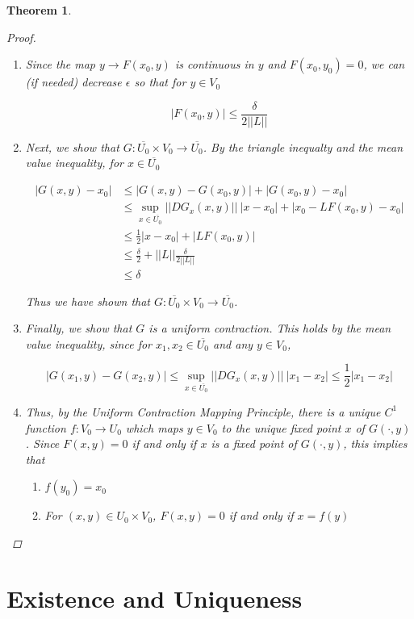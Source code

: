 \documentclass{article}
\newtheorem{theorem}{Theorem}[section]
\begin{document}
\begin{theorem}
\begin{proof}
\begin{enumerate}
\[
||DG_x(x, y)|| < \frac{1}{2} 
\]

\item Since the map $y \rightarrow F(x_0, y)$ is continuous in $y$ and $F(x_0, y_0) = 0$, we can (if needed) decrease $\epsilon$ so that for $y \in V_0$

\[
|F(x_0, y)| \leq \frac{\delta}{2 ||L||}
\]

\item Next, we show that $G: \overline{U_0} \times V_0 \rightarrow \overline{U_0}$. By the triangle inequalty and the mean value inequality, for $x \in \overline{U_0}$

\begin{align*}
|G(x, y) - x_0| &\leq |G(x, y) - G(x_0, y)| + |G(x_0, y) - x_0| \\
&\leq \sup_{x\in \overline{U_0}}||DG_x(x, y)||\:|x - x_0| + |x_0 - L F(x_0, y) - x_0 | \\
&\leq \frac{1}{2} |x - x_0| + |L F(x_0, y)| \\
&\leq \frac{\delta}{2} + ||L|| \frac{\delta}{2 ||L||} \\
&\leq \delta
\end{align*}

Thus we have shown that $G: \overline{U_0} \times V_0 \rightarrow \overline{U_0}$. 

\item Finally, we show that $G$ is a uniform contraction. This holds by the mean value inequality, since for $x_1, x_2 \in \overline{U_0}$ and any $y \in V_0$,

\[
|G(x_1, y) - G(x_2, y)| \leq \sup_{x\in \overline{U_0}}||DG_x(x, y)||\:|x_1 - x_2| \leq \frac{1}{2}|x_1 - x_2|
\]
\item Thus, by the Uniform Contraction Mapping Principle, there is a unique $C^1$ function $f: V_0 \rightarrow U_0$ which maps $y \in V_0$ to the unique fixed point $x$ of $G(\cdot, y)$. Since $F(x, y) = 0$ if and only if $x$ is a fixed point of $G(\cdot, y)$, this implies that 
	\begin{enumerate}
	\item $f(y_0) = x_0$
	\item For $(x, y) \in U_0 \times V_0$, $F(x, y) = 0$ if and only if $x = f(y)$
	\end{enumerate}
\end{enumerate}
\end{proof}
\end{theorem}

\section{Existence and Uniqueness}
\end{document}
